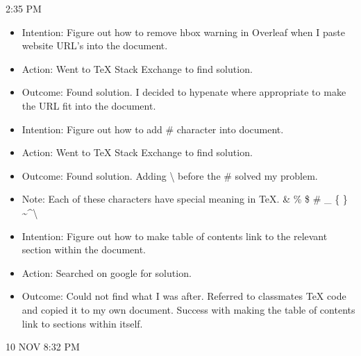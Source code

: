 \documentclass{article}
\begin{document}
2:35 PM

\begin{itemize}
    \item Intention: Figure out how to remove hbox warning in Overleaf when I paste website URL's into the document.
    \item Action: Went to TeX Stack Exchange to find solution.
    \item Outcome: Found solution. I decided to hypenate where appropriate to make the URL fit into the document.

    \item Intention: Figure out how to add \# character into document.
    \item Action: Went to TeX Stack Exchange to find solution.
    \item Outcome: Found solution. Adding {\textbackslash} before the \# solved my problem.
    \item Note: Each of these characters have special meaning in TeX. \& \% \$ \# \_ \{ \} \textasciitilde \textasciicircum \textbackslash
    \item Intention: Figure out how to make table of contents link to the relevant section within the document.
    \item Action: Searched on google for solution.
    \item Outcome: Could not find what I was after. Referred to classmates TeX code and copied it to my own document. Success with making the table of contents link to sections within itself.
\end{itemize}

10 NOV 8:32 PM
\end{document}
